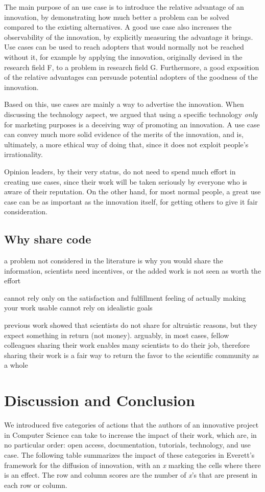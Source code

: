 \documentclass[12pt]{article}
\begin{document}
The main purpose of an use case is to introduce the relative advantage of an innovation, by demonstrating how much better a problem can be solved compared to the existing alternatives. A good use case also increases the observability of the innovation, by explicitly measuring the advantage it brings. Use cases can be used to reach adopters that would normally not be reached without it, for example by applying the innovation, originally devised in the research field F, to a problem in research field G. Furthermore, a good exposition of the relative advantages can persuade potential adopters of the goodness of the innovation.

Based on this, use cases are mainly a way to advertise the innovation. When discussing the technology aspect, we argued that using a specific technology \emph{only} for marketing purposes is a deceiving way of promoting an innovation. A use case can convey much more solid evidence of the merits of the innovation, and is, ultimately, a more ethical way of doing that, since it does not exploit people's irrationality.

Opinion leaders, by their very status, do not need to spend much effort in creating use cases, since their work will be taken seriously by everyone who is aware of their reputation. On the other hand, for most normal people, a great use case can be as important as the innovation itself, for getting others to give it fair consideration.

\subsection{Why share code}
\label{sec:org50b196c}
a problem not considered in the literature is why you would share the information, scientists need incentives, or the added work is not seen as worth the effort

cannot rely only on the satisfaction and fulfillment feeling of actually making your work usable
cannot rely on idealistic goals

previous work showed that scientists do not share for altruistic reasons, but they expect something in return (not money). arguably, in most cases, fellow colleagues sharing their work enables many scientists to do their job, therefore sharing their work is a fair way to return the favor to the scientific community as a whole


\section{Discussion and Conclusion}
\label{sec:org746eb91}
We introduced five categories of actions that the authors of an innovative project in Computer Science can take to increase the impact of their work, which are, in no particular order: open access, documentation, tutorials, technology, and use case. The following table summarizes the impact of these categories in Everett's framework for the diffusion of innovation, with an \emph{x} marking the cells where there is an effect. The row and column scores are the number of \emph{x}'s that are present in each row or column.
\end{document}
